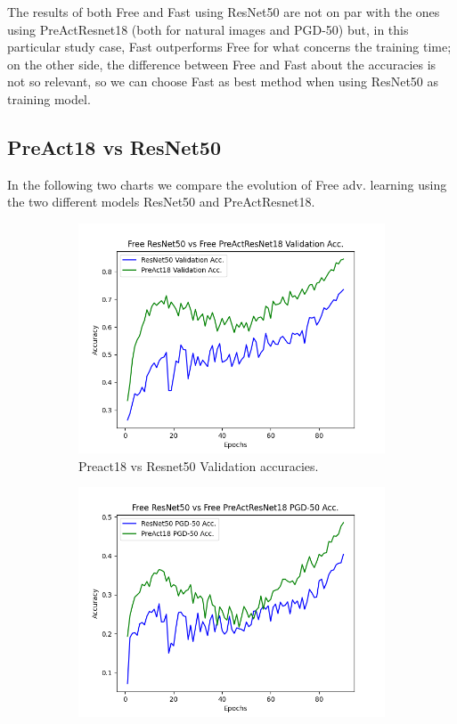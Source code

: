 \documentclass{article}
\begin{document}
The results of both Free and Fast using ResNet50 are not on par with the ones using PreActResnet18 (both for natural images and PGD-50) but, in this particular study case, Fast outperforms Free for what concerns the training time; on the other side, the difference between Free and Fast about the accuracies is not so relevant, so we can choose Fast as best method when using ResNet50 as training model.

\subsection{PreAct18 vs ResNet50}
In the following two charts we compare the evolution of Free adv. learning using
the two different models ResNet50 and PreActResnet18. 



\begin{figure}[hbt!]
  \centering
  \begin{subfigure}[b]{0.4\linewidth}
    \includegraphics[width=\linewidth]{images/freeComp/Figure_1.png}
    \caption{Preact18 vs Resnet50  Validation accuracies.}
  \end{subfigure}
  \begin{subfigure}[b]{0.4\linewidth}
    \includegraphics[width=\linewidth]{images/freeComp/Figure_2.png}

\end{subfigure}
\end{figure}
\end{document}

